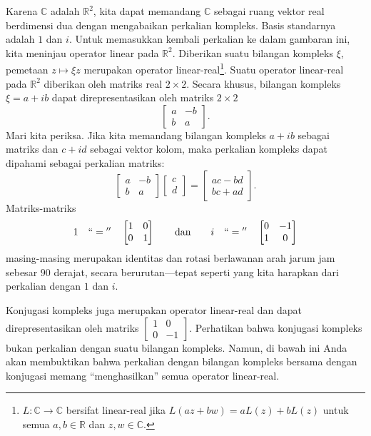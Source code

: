 \documentclass[12pt,openany]{book}
\newcommand{\C}{{\mathbb{C}}}
\newcommand{\R}{{\mathbb{R}}}
\newcommand{\myquote}[1]{``#1''}
\theoremstyle{plain}
\theoremstyle{remark}
\theoremstyle{definition}
\theoremstyle{exercise}
\theoremstyle{example}
\begin{document}
Karena $\C$ adalah $\R^2$, kita dapat memandang
$\C$ sebagai ruang vektor real berdimensi dua dengan mengabaikan
perkalian kompleks.  Basis standarnya adalah $1$ dan $i$.
Untuk memasukkan kembali perkalian ke dalam gambaran ini, kita meninjau operator linear
pada $\R^2$.
Diberikan suatu bilangan kompleks $\xi$, pemetaan $z \mapsto  \xi z$ merupakan
operator linear-real\footnote{$L \colon \C \to \C$ bersifat linear-real jika
$L(a z + b w) = aL(z)+bL(z)$ untuk semua $a,b \in \R$ dan $z,w \in \C$.}.
Suatu operator linear-real pada $\R^2$ diberikan oleh matriks real
$2 \times 2$.
Secara khusus, bilangan kompleks $\xi = a+ib$ dapat direpresentasikan oleh matriks $2 \times 2$
\begin{equation} \label{eq:complexnumbermatrix}
\begin{bmatrix}
a & -b \\
b & a
\end{bmatrix} .
\end{equation}
Mari kita periksa.
Jika kita memandang bilangan kompleks $a+ib$ sebagai matriks
dan $c+id$ sebagai vektor kolom,
maka perkalian kompleks dapat dipahami sebagai perkalian matriks:
\begin{equation*}
\begin{bmatrix}
a & -b \\
b & a
\end{bmatrix}
\begin{bmatrix}
c \\
d 
\end{bmatrix}
=
\begin{bmatrix}
ac-bd \\
bc+ad
\end{bmatrix} .
\end{equation*}
Matriks-matriks
\begin{equation*}
1 \quad ``{}={}'' \quad
\begin{bmatrix}
1 & 0 \\
0 & 1
\end{bmatrix} \qquad \text{dan} \qquad
i \quad ``{}={}'' \quad
\begin{bmatrix}
0 & -1 \\
1 & 0
\end{bmatrix} 
\end{equation*}
masing-masing merupakan identitas dan rotasi berlawanan arah jarum jam sebesar $90$ derajat,
secara berurutan---tepat seperti yang kita harapkan dari
perkalian dengan $1$ dan $i$.

Konjugasi kompleks juga merupakan operator
linear-real dan dapat direpresentasikan oleh matriks $\left[ \begin{smallmatrix} 1 & 0 \\ 0 &
-1 \end{smallmatrix} \right]$.  Perhatikan bahwa konjugasi kompleks
bukan perkalian dengan suatu bilangan kompleks.
Namun, di bawah ini Anda akan membuktikan
bahwa perkalian dengan bilangan kompleks bersama dengan konjugasi
memang \myquote{menghasilkan} semua operator linear-real.
\end{document}
